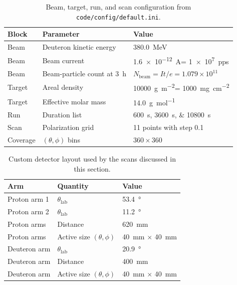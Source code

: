 \documentclass[11pt,a4paper]{article}
\begin{document}
\begin{table}[htbp]
    \centering
    \caption{Beam, target, run, and scan configuration from \texttt{code/config/default.ini}.}
    \label{tab:default_config_main}
    \begin{tabular}{lll}
        \hline
        Block & Parameter & Value \\
        \hline
        Beam & Deuteron kinetic energy & \SI{380.0}{MeV} \\
        Beam & Beam current & \SI{1.6e-12}{A}= \SI{1e7}{pps} \\
        Beam & Beam-particle count at \SI{3}{h} & $N_{\mathrm{beam}} = It/e = 1.079\times 10^{11}$ \\
        Target & Areal density & \SI{10000}{g.m^{-2}}= \SI{1000}{mg.cm^{-2}} \\
        Target & Effective molar mass & \SI{14.0}{g.mol^{-1}} \\
        Run & Duration list & \SIlist{600;3600;10800}{s} \\
        Scan & Polarization grid & 11 points with step 0.1 \\
        Coverage & $(\theta,\phi)$ bins & $360\times 360$ \\
        \hline
    \end{tabular}
\end{table}

\begin{table}[htbp]
    \centering
    \caption{Custom detector layout used by the scans discussed in this section.}
    \label{tab:default_config_layout}
    \begin{tabular}{lll}
        \hline
        Arm & Quantity & Value \\
        \hline
        Proton arm 1 & $\theta_{\mathrm{lab}}$ & \SI{53.4}{\degree} \\
        Proton arm 2 & $\theta_{\mathrm{lab}}$ & \SI{11.2}{\degree} \\
        Proton arms & Distance & \SI{620}{mm} \\
        Proton arms & Active size $(\theta,\phi)$ & \SI{40}{mm} $\times$ \SI{40}{mm} \\
        Deuteron arm & $\theta_{\mathrm{lab}}$ & \SI{20.9}{\degree} \\
        Deuteron arm & Distance & \SI{400}{mm} \\
        Deuteron arm & Active size $(\theta,\phi)$ & \SI{40}{mm} $\times$ \SI{40}{mm} \\
        \hline
    \end{tabular}
\end{table}
\end{document}
